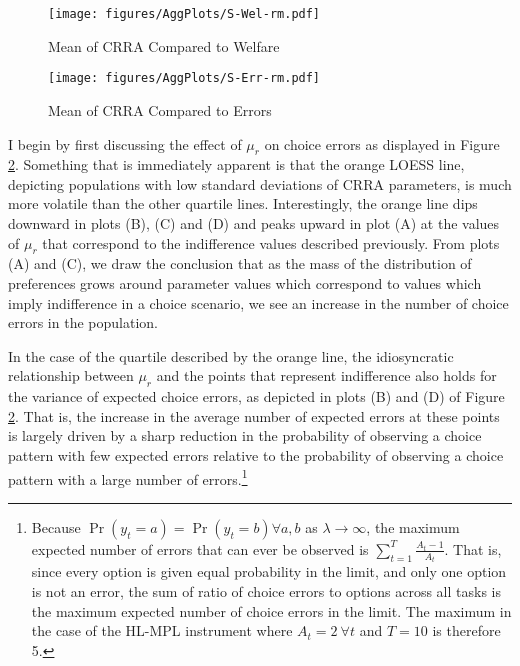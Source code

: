 \documentclass[../main.tex]{subfiles}
\begin{document}
\begin{figure}[h!]
	\center
	\caption{Mean of CRRA Compared to Welfare}
	\texttt{[image: figures/AggPlots/S-Wel-rm.pdf]}
	\label{fig:S-Wel-rm}
\end{figure}

\begin{figure}[h!]
	\center
	\caption{Mean of CRRA Compared to Errors}
	\texttt{[image: figures/AggPlots/S-Err-rm.pdf]}
	\label{fig:S-Err-rm}
\end{figure}

I begin by first discussing the effect of $\mu_r$ on choice errors as displayed in Figure \ref{fig:S-Err-rm}.
Something that is immediately apparent is that the orange LOESS line, depicting populations with low standard deviations of CRRA parameters, is much more volatile than the other quartile lines.
Interestingly, the orange line dips downward in plots (B), (C) and (D) and peaks upward in plot (A) at the values of $\mu_r$ that correspond to the indifference values described previously.
From plots (A) and (C), we draw the conclusion that as the mass of the distribution of preferences grows around parameter values which correspond to values which imply indifference in a choice scenario, we see an increase in the number of choice errors in the population.

In the case of the quartile described by the orange line, the idiosyncratic relationship between $\mu_r$ and the points that represent indifference also holds for the variance of expected choice errors, as depicted in plots (B) and (D) of Figure \ref{fig:S-Err-rm}.
That is, the increase in the average number of expected errors at these points is largely driven by a sharp reduction in the probability of observing a choice pattern with few expected errors relative to the probability of observing a choice pattern with a large number of errors.\footnote{
	Because $\Pr(y_t=a) = \Pr(y_t=b) \forall a,b$ as $\lambda \to \infty$, the maximum expected number of errors that can ever be observed is $\sum_{t=1}^T \frac{A_t -1}{A_t}$.
	That is, since every option is given equal probability in the limit, and only one option is not an error, the sum of ratio of choice errors to options across all tasks is the maximum expected number of choice errors in the limit.
	The maximum in the case of the HL-MPL instrument where $A_t = 2 \ \forall t$ and $T=10$ is therefore 5.
}
\end{document}
